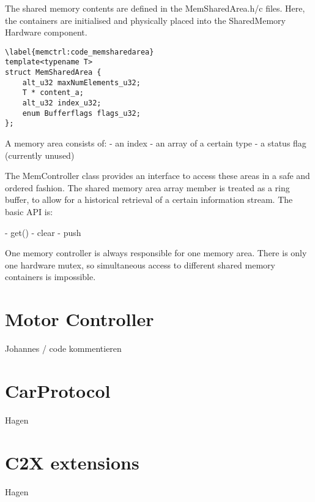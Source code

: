  The shared memory contents are defined in the MemSharedArea.h/c files. Here, the containers are initialised and physically placed into the SharedMemory Hardware component.


\begin{lstlisting}[stype=customc, caption='The MemSharedArea struct']\label{memctrl:code_memsharedarea}
template<typename T>
struct MemSharedArea {
	alt_u32 maxNumElements_u32;
	T * content_a;
	alt_u32 index_u32;
	enum Bufferflags flags_u32;
};
\end{lstlisting}

A memory area consists of:
- an index
- an array of a certain type
- a status flag (currently unused)

The MemController class provides an interface to access these areas in a safe and ordered fashion. The shared memory area array member is treated as a ring buffer, to allow for a historical retrieval of a certain information stream. The basic API is:

- get()
- clear
- push

One memory controller is always responsible for one memory area. There is only one hardware mutex, so simultaneous access to different shared memory containers is impossible. 


\section{Motor Controller}
Johannes / code kommentieren

\section{CarProtocol}
Hagen

\section{C2X extensions}
Hagen
